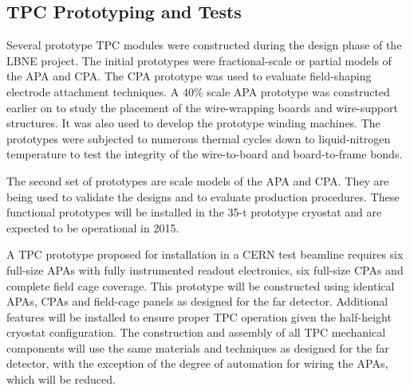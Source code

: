 

\subsection{TPC Prototyping and Tests}
\label{subsec:fd-ref-tpc-proto}


Several prototype TPC modules were constructed during the design phase
of the LBNE project. The initial prototypes were fractional-scale
or partial models of the APA and CPA. The CPA prototype was used to
evaluate field-shaping electrode attachment techniques. A 40\% scale
APA prototype was constructed earlier on to study the placement of the
wire-wrapping boards and wire-support structures. It was also used to
develop the prototype winding machines. The prototypes were subjected
to numerous thermal cycles down to liquid-nitrogen temperature to test
the integrity of the wire-to-board and board-to-frame bonds.

The second set of prototypes are scale models of the APA and CPA. They
are being used to validate the designs and to evaluate production
procedures. These functional prototypes will be installed in the 35-t
prototype cryostat  %
and are expected to be operational in 2015.

A TPC prototype proposed for installation %
in a CERN test beamline
requires six full-size APAs with fully instrumented readout electronics,
six full-size CPAs and complete field cage coverage. This prototype will be %
constructed using identical APAs, CPAs and field-cage panels as
designed for the far detector. Additional features will be installed
to ensure proper TPC operation given the half-height cryostat
configuration. The construction and assembly of all TPC mechanical
components will use the same materials and techniques as designed for
the far detector, with the exception of the degree of automation for wiring
the APAs, which will be reduced.

